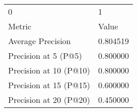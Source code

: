 \begin{tabular}{ll}
0 & 1 \\
Metric & Value \\
Average Precision & 0.804519 \\
Precision at 5 (P@5) & 0.800000 \\
Precision at 10 (P@10) & 0.800000 \\
Precision at 15 (P@15) & 0.600000 \\
Precision at 20 (P@20) & 0.450000 \\
\end{tabular}
